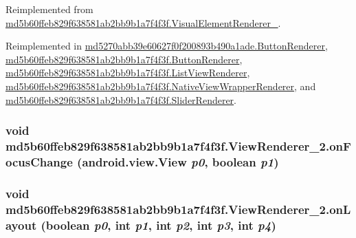 Reimplemented from \hyperlink{classmd5b60ffeb829f638581ab2bb9b1a7f4f3f_1_1_visual_element_renderer__1_93658aeaafe1fbcb5301e4b9cbf9f833}{md5b60ffeb829f638581ab2bb9b1a7f4f3f.VisualElementRenderer\_}.

Reimplemented in \hyperlink{classmd5270abb39e60627f0f200893b490a1ade_1_1_button_renderer_fd8f463e834eac0c0aa3ec80c6a310bc}{md5270abb39e60627f0f200893b490a1ade.ButtonRenderer}, \hyperlink{classmd5b60ffeb829f638581ab2bb9b1a7f4f3f_1_1_button_renderer_3d85bf7ad5f9368589a177164ef752bd}{md5b60ffeb829f638581ab2bb9b1a7f4f3f.ButtonRenderer}, \hyperlink{classmd5b60ffeb829f638581ab2bb9b1a7f4f3f_1_1_list_view_renderer_88db0ee991444107111a9da6f510dfc5}{md5b60ffeb829f638581ab2bb9b1a7f4f3f.ListViewRenderer}, \hyperlink{classmd5b60ffeb829f638581ab2bb9b1a7f4f3f_1_1_native_view_wrapper_renderer_7b65d0e1278ae3edf756f1f5dccf72fa}{md5b60ffeb829f638581ab2bb9b1a7f4f3f.NativeViewWrapperRenderer}, and \hyperlink{classmd5b60ffeb829f638581ab2bb9b1a7f4f3f_1_1_slider_renderer_77b7da7854dd07e25a132e99b1f712ad}{md5b60ffeb829f638581ab2bb9b1a7f4f3f.SliderRenderer}.\hypertarget{classmd5b60ffeb829f638581ab2bb9b1a7f4f3f_1_1_view_renderer__2_44502ddde192de41caed438bc7428e96}{
\subsubsection[{onFocusChange}]{\setlength{\rightskip}{0pt plus 5cm}void md5b60ffeb829f638581ab2bb9b1a7f4f3f.ViewRenderer\_\-2.onFocusChange (android.view.View {\em p0}, \/  boolean {\em p1})}}
\label{classmd5b60ffeb829f638581ab2bb9b1a7f4f3f_1_1_view_renderer__2_44502ddde192de41caed438bc7428e96}


\hypertarget{classmd5b60ffeb829f638581ab2bb9b1a7f4f3f_1_1_view_renderer__2_0b758be41e41d3577cadf82bc8d004b6}{
\subsubsection[{onLayout}]{\setlength{\rightskip}{0pt plus 5cm}void md5b60ffeb829f638581ab2bb9b1a7f4f3f.ViewRenderer\_\-2.onLayout (boolean {\em p0}, \/  int {\em p1}, \/  int {\em p2}, \/  int {\em p3}, \/  int {\em p4})}}
\label{classmd5b60ffeb829f638581ab2bb9b1a7f4f3f_1_1_view_renderer__2_0b758be41e41d3577cadf82bc8d004b6}




